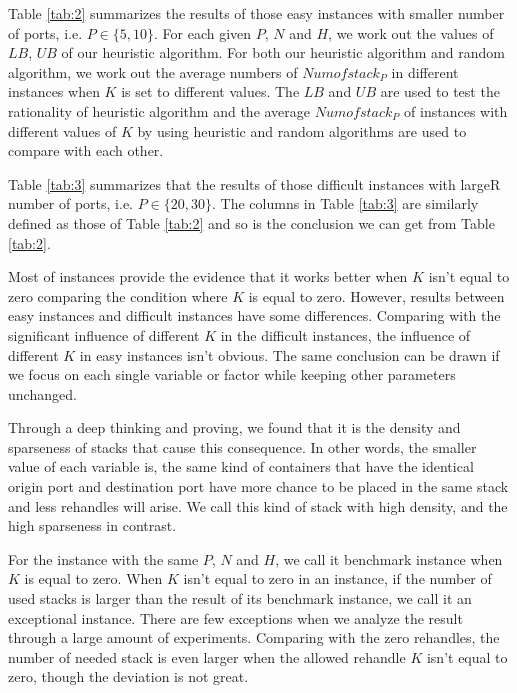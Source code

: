 \documentclass[review,3p,times,authoryear,12pt]{elsarticle}
\begin{document}
Table \ref{tab:2} summarizes the results of those easy instances with smaller number of ports, i.e. $P \in \{5, 10\}$.
For each given $P$, $N$ and $H$, we work out the values of $LB$, $UB$ of our heuristic algorithm.
For both our heuristic algorithm and random algorithm, we work out the average numbers of $Numofstack_P$ in different instances when $K$ is set to different values.
The $LB$ and $UB$ are used to test the rationality of heuristic algorithm and the average $Numofstack_P$ of instances with different values of $K$ by using heuristic and random algorithms are used to compare with each other.

Table \ref{tab:3} summarizes that the results of those difficult instances with largeR number of ports, i.e. $P \in \{20, 30\}$.
The columns in Table \ref{tab:3} are similarly defined as those of Table \ref{tab:2} and so is the conclusion we can get from Table \ref{tab:2}.

Most of instances provide the evidence that it works better when $K$ isn't equal to zero comparing the condition where $K$ is equal to zero.
However, results between easy instances and difficult instances have some differences.
Comparing with the significant influence of different $K$ in the difficult instances, the influence of different $K$ in easy instances isn't obvious.
The same conclusion can be drawn if we focus on each single variable or factor while keeping other parameters unchanged.

Through a deep thinking and proving, we found that it is the density and sparseness of stacks that cause this consequence.
In other words, the smaller value of each variable is, the same kind of containers that have the identical origin port and destination port have more chance to be placed in the same stack and less rehandles will arise.
We call this kind of stack with high density, and the high sparseness in contrast.

For the instance with the same $P$, $N$ and $H$, we call it benchmark instance when $K$ is equal to zero.
When $K$ isn't equal to zero in an instance, if the number of used stacks is larger than the result of its benchmark instance, we call it an exceptional instance.
There are few exceptions when we analyze the result through a large amount of experiments.
Comparing with the zero rehandles, the number of needed stack is even larger when the allowed rehandle $K$ isn't equal to zero, though the deviation is not great.
\end{document}

